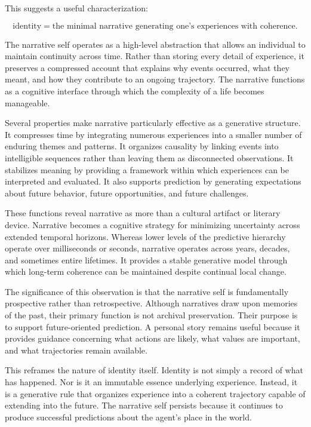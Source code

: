 \documentclass[12pt,letterpaper]{article}
\theoremstyle{remark}
\begin{document}
This suggests a useful characterization:

\[
\text{identity} =
\text{the minimal narrative generating one's experiences with coherence}.
\]

The narrative self operates as a high-level abstraction that allows an individual to maintain continuity across time. Rather than storing every detail of experience, it preserves a compressed account that explains why events occurred, what they meant, and how they contribute to an ongoing trajectory. The narrative functions as a cognitive interface through which the complexity of a life becomes manageable.

Several properties make narrative particularly effective as a generative structure. It compresses time by integrating numerous experiences into a smaller number of enduring themes and patterns. It organizes causality by linking events into intelligible sequences rather than leaving them as disconnected observations. It stabilizes meaning by providing a framework within which experiences can be interpreted and evaluated. It also supports prediction by generating expectations about future behavior, future opportunities, and future challenges.

These functions reveal narrative as more than a cultural artifact or literary device. Narrative becomes a cognitive strategy for minimizing uncertainty across extended temporal horizons. Whereas lower levels of the predictive hierarchy operate over milliseconds or seconds, narrative operates across years, decades, and sometimes entire lifetimes. It provides a stable generative model through which long-term coherence can be maintained despite continual local change.

The significance of this observation is that the narrative self is fundamentally prospective rather than retrospective. Although narratives draw upon memories of the past, their primary function is not archival preservation. Their purpose is to support future-oriented prediction. A personal story remains useful because it provides guidance concerning what actions are likely, what values are important, and what trajectories remain available.

This reframes the nature of identity itself. Identity is not simply a record of what has happened. Nor is it an immutable essence underlying experience. Instead, it is a generative rule that organizes experience into a coherent trajectory capable of extending into the future. The narrative self persists because it continues to produce successful predictions about the agent's place in the world.
\end{document}
